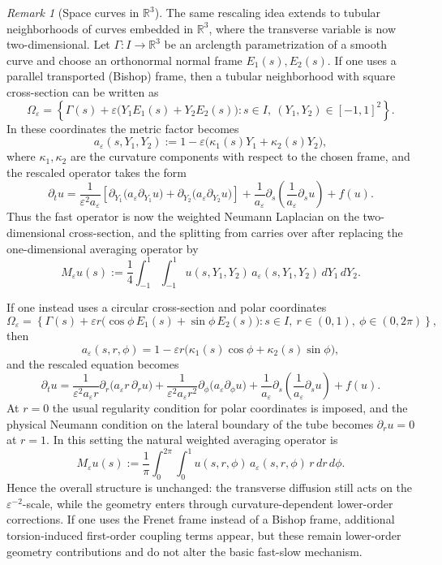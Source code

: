 \documentclass[11pt]{article}
\theoremstyle{definition}
\theoremstyle{remark}
\newtheorem{remark}[theorem]{Remark}
\numberwithin{equation}{section}
\begin{document}
\begin{remark}[Space curves in $\mathbb{R}^3$]
The same rescaling idea extends to tubular neighborhoods of curves embedded in $\mathbb{R}^3$, where the transverse variable is now two-dimensional. Let $\Gamma:I\to\mathbb{R}^3$ be an arclength parametrization of a smooth curve and choose an orthonormal normal frame $E_1(s),E_2(s)$. If one uses a parallel transported (Bishop) frame, then a tubular neighborhood with square cross-section can be written as
\[
\Omega_\varepsilon
=
\left\{
\Gamma(s)+\varepsilon\bigl(Y_1E_1(s)+Y_2E_2(s)\bigr):
s\in I,\ (Y_1,Y_2)\in[-1,1]^2
\right\}.
\]
In these coordinates the metric factor becomes
\[
a_\varepsilon(s,Y_1,Y_2):=1-\varepsilon\bigl(\kappa_1(s)Y_1+\kappa_2(s)Y_2\bigr),
\]
where $\kappa_1,\kappa_2$ are the curvature components with respect to the chosen frame, and the rescaled operator takes the form
\[
\partial_t u
=
\frac{1}{\varepsilon^2a_\varepsilon}
\left[
\partial_{Y_1}\!\bigl(a_\varepsilon \partial_{Y_1}u\bigr)
+
\partial_{Y_2}\!\bigl(a_\varepsilon \partial_{Y_2}u\bigr)
\right]
+
\frac{1}{a_\varepsilon}\partial_s\!\left(\frac{1}{a_\varepsilon}\partial_s u\right)
+
f(u).
\]
Thus the fast operator is now the weighted Neumann Laplacian on the two-dimensional cross-section, and the splitting from  carries over after replacing the one-dimensional averaging operator by
\[
M_\varepsilon u(s)
:=
\frac14\int_{-1}^1\int_{-1}^1
u(s,Y_1,Y_2)\,a_\varepsilon(s,Y_1,Y_2)\,dY_1\,dY_2.
\]

If one instead uses a circular cross-section and polar coordinates
\[
\Omega_\varepsilon
=
\left\{
\Gamma(s)+\varepsilon r\bigl(\cos\phi\,E_1(s)+\sin\phi\,E_2(s)\bigr):
s\in I,\ r\in(0,1),\ \phi\in(0,2\pi)
\right\},
\]
then
\[
a_\varepsilon(s,r,\phi)
=
1-\varepsilon r\bigl(\kappa_1(s)\cos\phi+\kappa_2(s)\sin\phi\bigr),
\]
and the rescaled equation becomes
\[
\partial_t u
=
\frac{1}{\varepsilon^2a_\varepsilon r}
\partial_r\!\bigl(a_\varepsilon r\,\partial_r u\bigr)
+
\frac{1}{\varepsilon^2a_\varepsilon r^2}
\partial_\phi\!\bigl(a_\varepsilon \partial_\phi u\bigr)
+
\frac{1}{a_\varepsilon}\partial_s\!\left(\frac{1}{a_\varepsilon}\partial_s u\right)
+
f(u).
\]
At \(r=0\) the usual regularity condition for polar coordinates is imposed,
and the physical Neumann condition on the lateral boundary of the tube becomes
\(\partial_r u=0\) at \(r=1\).
In this setting the natural weighted averaging operator is
\[
M_\varepsilon u(s)
:=
\frac{1}{\pi}
\int_0^{2\pi}\int_0^1
u(s,r,\phi)\,a_\varepsilon(s,r,\phi)\,r\,dr\,d\phi.
\]
Hence the overall structure is unchanged: the transverse diffusion still acts on the $\varepsilon^{-2}$-scale, while the geometry enters through curvature-dependent lower-order corrections. If one uses the Frenet frame instead of a Bishop frame, additional torsion-induced first-order coupling terms appear, but these remain lower-order geometry contributions and do not alter the basic fast-slow mechanism.
\end{remark}
\end{document}
